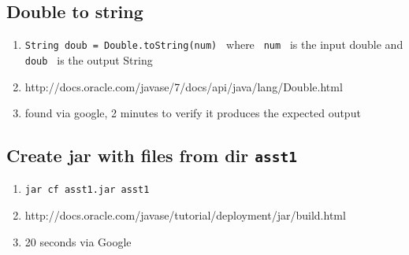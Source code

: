 \documentclass{article}
\begin{document}
\subsection{Double to string}
\begin{enumerate}
	\item \verb|String doub = Double.toString(num) | where \verb| num | is the input double and \verb| doub | is the output String
	\item http://docs.oracle.com/javase/7/docs/api/java/lang/Double.html
	\item found via google, 2 minutes to verify it produces the expected output
\end{enumerate}

\subsection{Create jar with files from dir \tt asst1}
\begin{enumerate}
	\item \verb|jar cf asst1.jar asst1|
	\item http://docs.oracle.com/javase/tutorial/deployment/jar/build.html
	\item 20 seconds via Google
\end{enumerate}
\end{document}
